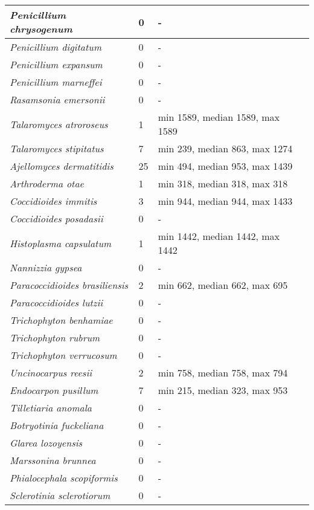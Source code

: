 {\begin{longtable}{| L{4cm} | L{2cm}  | L{5cm} | L{4cm} |}
\textit{Penicillium chrysogenum} & 0 & - & \\ \hline
\textit{Penicillium digitatum} & 0 & - & \\ \hline
\textit{Penicillium expansum} & 0 & - & \\ \hline
\textit{Penicillium marneffei} & 0 & - & \\ \hline
\textit{Rasamsonia emersonii} & 0 & - & \\ \hline
\textit{Talaromyces atroroseus} & 1 & min 1589, median 1589, max 1589 & \\ \hline
\textit{Talaromyces stipitatus} & 7 & min 239, median 863, max 1274 & \\ \hline
\textit{Ajellomyces dermatitidis} & 25 & min 494, median 953, max 1439 & \\ \hline
\textit{Arthroderma otae} & 1 & min 318, median 318, max 318 & \\ \hline
\textit{Coccidioides immitis} & 3 & min 944, median 944, max 1433 & \\ \hline
\textit{Coccidioides posadasii} & 0 & - & \\ \hline
\textit{Histoplasma capsulatum} & 1 & min 1442, median 1442, max 1442 & \\ \hline
\textit{Nannizzia gypsea} & 0 & - & \\ \hline
\textit{Paracoccidioides brasiliensis} & 2 & min 662, median 662, max 695 & \\ \hline
\textit{Paracoccidioides lutzii} & 0 & - & \\ \hline
\textit{Trichophyton benhamiae} & 0 & - & \\ \hline
\textit{Trichophyton rubrum} & 0 & - & \\ \hline
\textit{Trichophyton verrucosum} & 0 & - & \\ \hline
\textit{Uncinocarpus reesii} & 2 & min 758, median 758, max 794 & \\ \hline
\textit{Endocarpon pusillum} & 7 & min 215, median 323, max 953 & \\ \hline
\textit{Tilletiaria anomala} & 0 & - & \\ \hline
\textit{Botryotinia fuckeliana} & 0 & - & \\ \hline
\textit{Glarea lozoyensis} & 0 & - & \\ \hline
\textit{Marssonina brunnea} & 0 & - & \\ \hline
\textit{Phialocephala scopiformis} & 0 & - & \\ \hline
\textit{Sclerotinia sclerotiorum} & 0 & - & \\ \hline

\end{longtable}}
